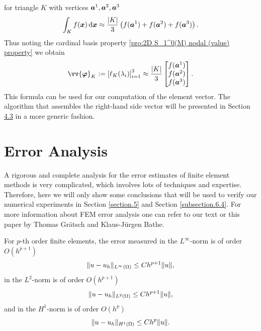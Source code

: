 	for triangle $K$ with vertices $\bm{a}^1,\bm{a}^2,\bm{a}^3$
	\begin{equation}
		\int_{K}f(\bm{x})\,\mathrm{d}\bm{x}\approx
			\frac{|K|}{3}\left(f(\bm{a}^1)+f(\bm{a}^2)+f(\bm{a}^3)\right).
	\end{equation}
	Thus noting the cardinal basis property
	\eqref{pro:2D S_1^0(M) nodal (value) property} we obtain
	\begin{equation}\label{eq:2D element (load) vector formula}
		\vv{\bm{\varphi}}_K := \left[\ell_K(\lambda_i)\right]_{i=1}^3
		\approx \frac{|K|}{3}
		\begin{bmatrix}
			f(\ba^1)\\f(\ba^2)\\f(\ba^3)
		\end{bmatrix}.		
	\end{equation}
	This formula can be used for our computation of the element vector.
	The algorithm that assembles the right-hand side vector will be presented 
	in Section \hyperref[alg:assembleRhsVector]{4.3} in a more generic fashion.
		
	\section{Error Analysis}\label{section.3}
	A rigorous and complete analysis for the error estimates of finite element
	methods	is very complicated, which involves lots of techniques and 
	expertise. Therefore, here we will only show some conclusions that will be 
	used to	verify our numerical experiments in Section \ref{section.5} and 
	Section	\ref{subsection.6.4}. For more information about FEM error analysis 
	one	can refer to our text \cite[Section 2.2, 2.8]{LiRh} or this paper 
	\cite{FEMEA2005} by Thomas Gr\"{a}tsch and Klaus-J\"{u}rgen Bathe.\\
	
	\begin{mdframed}[linecolor=mid-green,linewidth=.5pt,roundcorner=10pt]
	For $p$-th order finite elements, the error measured in the $L^\infty$-norm 
	is of order $O(h^{p+1})$
	\[\lVert u-u_h\rVert_{L^\infty(\Omega)}\leq Ch^{p+1}\lVert u\rVert,\]
	in the $L^2$-norm is of order $O(h^{p+1})$
	\[\lVert u-u_h\rVert_{L^2(\Omega)}\leq Ch^{p+1}\lVert u\rVert,\]
	and in the $H^1$-norm is of order $O(h^{p})$
	\[\lVert u-u_h\rVert_{H^1(\Omega)}\leq Ch^{p}\lVert u\rVert.\]
	\end{mdframed}
	
	\clearpage
